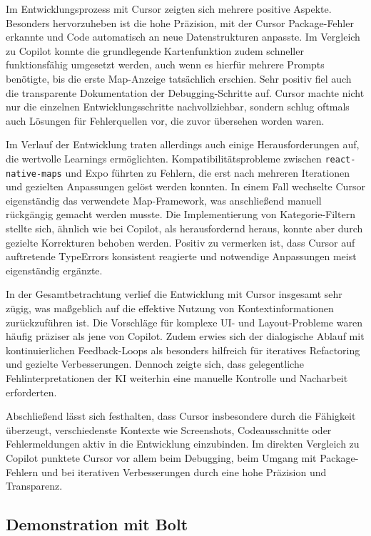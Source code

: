 Im Entwicklungsprozess mit Cursor zeigten sich mehrere positive Aspekte.
Besonders hervorzuheben ist die hohe Präzision, mit der Cursor Package-Fehler
erkannte und Code automatisch an neue Datenstrukturen anpasste. Im Vergleich zu
Copilot konnte die grundlegende Kartenfunktion zudem schneller funktionsfähig
umgesetzt werden, auch wenn es hierfür mehrere Prompts benötigte, bis die erste
Map-Anzeige tatsächlich erschien. Sehr positiv fiel auch die transparente
Dokumentation der Debugging-Schritte auf. Cursor machte nicht nur die einzelnen
Entwicklungsschritte nachvollziehbar, sondern schlug oftmals auch Lösungen für
Fehlerquellen vor, die zuvor übersehen worden waren.

Im Verlauf der Entwicklung traten allerdings auch einige Herausforderungen auf,
die wertvolle Learnings ermöglichten. Kompatibilitätsprobleme zwischen
\texttt{react-native-maps} und Expo führten zu Fehlern, die erst nach mehreren
Iterationen und gezielten Anpassungen gelöst werden konnten. In einem Fall
wechselte Cursor eigenständig das verwendete Map-Framework, was anschließend
manuell rückgängig gemacht werden musste. Die Implementierung von
Kategorie-Filtern stellte sich, ähnlich wie bei Copilot, als herausfordernd
heraus, konnte aber durch gezielte Korrekturen behoben werden. Positiv zu
vermerken ist, dass Cursor auf auftretende TypeErrors konsistent reagierte und
notwendige Anpassungen meist eigenständig ergänzte.

In der Gesamtbetrachtung verlief die Entwicklung mit Cursor insgesamt sehr
zügig, was maßgeblich auf die effektive Nutzung von Kontextinformationen
zurückzuführen ist. Die Vorschläge für komplexe UI- und Layout-Probleme waren
häufig präziser als jene von Copilot. Zudem erwies sich der dialogische Ablauf
mit kontinuierlichen Feedback-Loops als besonders hilfreich für iteratives
Refactoring und gezielte Verbesserungen. Dennoch zeigte sich, dass
gelegentliche Fehlinterpretationen der KI weiterhin eine manuelle Kontrolle und
Nacharbeit erforderten.

Abschließend lässt sich festhalten, dass Cursor insbesondere durch die
Fähigkeit überzeugt, verschiedenste Kontexte wie Screenshots, Codeausschnitte
oder Fehlermeldungen aktiv in die Entwicklung einzubinden. Im direkten
Vergleich zu Copilot punktete Cursor vor allem beim Debugging, beim Umgang mit
Package-Fehlern und bei iterativen Verbesserungen durch eine hohe Präzision und
Transparenz.

\subsection{Demonstration mit Bolt}

